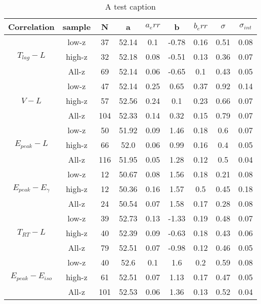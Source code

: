 \begin{table}
\centering
\begin{tabular}{|c|c|c|c|c|c|c|c|c|}
\hline
Correlation & sample & N & a & $a_err$ & b & $b_err$ & $\sigma$ & $\sigma_{int}$\\
\hline
\multirow{3}{*}{$T_{lag}-L$} & low-z & 37 & 52.14 & 0.1 & -0.78 & 0.16 & 0.51 & 0.08\\
\cline{2-9}
 & high-z & 32 & 52.18 & 0.08 & -0.51 & 0.13 & 0.36 & 0.07\\
\cline{2-9}
 & All-z & 69 & 52.14 & 0.06 & -0.65 & 0.1 & 0.43 & 0.05\\
\hline
\multirow{3}{*}{$V-L$} & low-z & 47 & 52.14 & 0.25 & 0.65 & 0.37 & 0.92 & 0.14\\
\cline{2-9}
 & high-z & 57 & 52.56 & 0.24 & 0.1 & 0.23 & 0.66 & 0.07\\
\cline{2-9}
 & All-z & 104 & 52.33 & 0.14 & 0.32 & 0.15 & 0.79 & 0.07\\
\hline
\multirow{3}{*}{$E_{peak}-L$} & low-z & 50 & 51.92 & 0.09 & 1.46 & 0.18 & 0.6 & 0.07\\
\cline{2-9}
 & high-z & 66 & 52.0 & 0.06 & 0.99 & 0.16 & 0.4 & 0.05\\
\cline{2-9}
 & All-z & 116 & 51.95 & 0.05 & 1.28 & 0.12 & 0.5 & 0.04\\
\hline
\multirow{3}{*}{$E_{peak}-E_{\gamma}$} & low-z & 12 & 50.67 & 0.08 & 1.56 & 0.18 & 0.21 & 0.08\\
\cline{2-9}
 & high-z & 12 & 50.36 & 0.16 & 1.57 & 0.5 & 0.45 & 0.18\\
\cline{2-9}
 & All-z & 24 & 50.54 & 0.07 & 1.58 & 0.17 & 0.28 & 0.08\\
\hline
\multirow{3}{*}{$T_{RT}-L$} & low-z & 39 & 52.73 & 0.13 & -1.33 & 0.19 & 0.48 & 0.07\\
\cline{2-9}
 & high-z & 40 & 52.39 & 0.09 & -0.63 & 0.18 & 0.43 & 0.06\\
\cline{2-9}
 & All-z & 79 & 52.51 & 0.07 & -0.98 & 0.12 & 0.46 & 0.05\\
\hline
\multirow{3}{*}{$E_{peak}-E_{iso}$} & low-z & 40 & 52.6 & 0.1 & 1.6 & 0.2 & 0.59 & 0.08\\
\cline{2-9}
 & high-z & 61 & 52.51 & 0.07 & 1.13 & 0.17 & 0.47 & 0.05\\
\cline{2-9}
 & All-z & 101 & 52.53 & 0.06 & 1.36 & 0.13 & 0.52 & 0.04\\
\hline
\end{tabular}
\caption{A test caption}
\label{table_union_lstm}
\end{table}